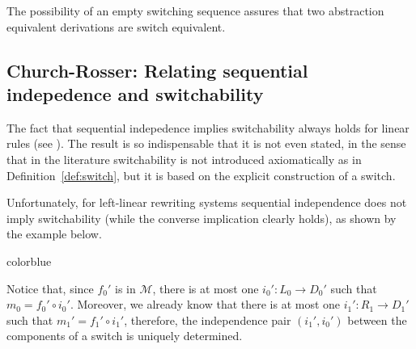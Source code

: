 \documentclass[a4paper,UKenglish,cleveref,pdftex, thm-restate,numberwithinsect,anonymous]{lipics}
\newcommand{\full}[1]{{color{blue}#1}}
\newcommand{\full}[1]{}
\begin{document}
\begin{remark}\label{rem:abst}
	The possibility of an empty switching sequence assures that two abstraction equivalent derivations are switch equivalent.
\end{remark}


\subsection{Church-Rosser: Relating sequential indepedence and switchability}\label{subsec:CR}


The fact that sequential indepedence implies switchability always
holds for linear rules (see ). The result is so
indispensable that it is not even stated, in the sense that
in the literature switchability is not introduced axiomatically as in
Definition~\ref{def:switch}, but it is based on the explicit
construction of a switch.

Unfortunately, for left-linear rewriting systems
sequential independence does not imply switchability (while the
converse implication clearly holds), as shown by the example below.

\full{
  \begin{remark}
    \label{rem:fact}
    Notice that, since $f_0'$ is in $\mathcal{M}$, there is
    at most one $i_0' \colon L_0\to D_0'$ such that
    $m_0=f_0' \circ i_0'$. Moreover, we already know that
    there is at most one $i_1' \colon R_1\to D_1'$ such that
    $m_1'=f_1' \circ i_1'$, therefore, the
    independence pair $(i_1',i_0')$ between the components of a switch is
    uniquely determined.
  \end{remark}
}
\end{document}
